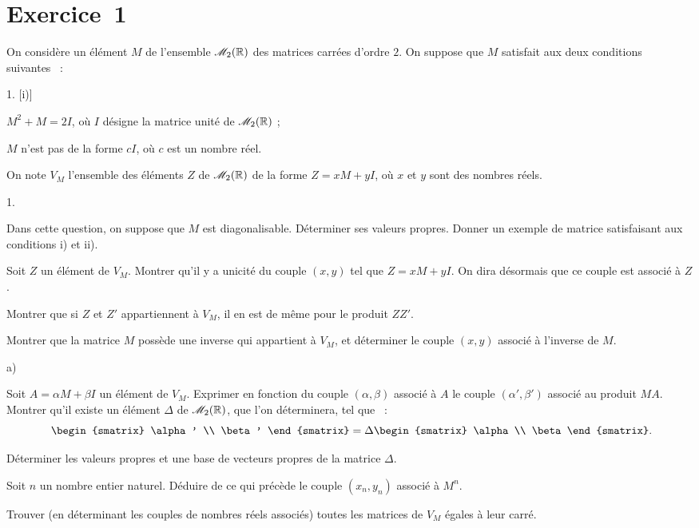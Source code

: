 \documentclass[11pt]{article}%
\begin{document}
\section*{Exercice~1}
On considère un élément $M$ de l'ensemble $\mathscr{M}_{2}(\mathbb{R})$ des matrices carrées
d'ordre $2$. On suppose que $M$ satisfait aux deux conditions
suivantes~ :
\begin{noliste}{1.}
 \setlength{\itemsep}{4mm}[i)]
\item $M^{2} + M = 2I$, où $I$ désigne la matrice unité de $\mathscr{M}_{2}(\mathbb{R})$ ;
\item $M$ n'est pas de la forme $cI$, où $c$ est un nombre réel.
\end{noliste}
On note $V_{M}$ l'ensemble des éléments $Z$ de $\mathscr{M}_{2}(\mathbb{R})$
de la forme $Z = xM + yI$, où $x$ et $y$ sont des nombres réels.
\begin{noliste}{1.}
 \setlength{\itemsep}{4mm}
\item Dans cette question, on suppose que $M$ est diagonalisable.
Déterminer
ses valeurs propres. Donner un exemple de matrice satisfaisant aux 
conditions i) et ii).
\item Soit $Z$ un élément de $V_{M}$. Montrer qu'il y a unicité du
couple
$(x,y)$ tel que $Z = xM + yI$. On dira désormais que ce couple est
associé
à $Z$.
\item Montrer que si $Z$ et $Z'$ appartiennent à $V_{M}$, il en est de
même
pour le produit $ZZ'$.
\item Montrer que la matrice $M$ possède une inverse qui appartient 
à $V_{M}$, et déterminer le couple $(x,y)$ associé à l'inverse de $M$.
\item 
\begin{noliste}{a)}
 \setlength{\itemsep}{2mm}
\item Soit $A = \alpha M + \beta I$ un élément de $V_{M}$.
Exprimer en fonction du couple $(\alpha, \beta )$ associé à $A$ le
couple
$(\alpha', \beta' )$ associé au produit $MA$. Montrer qu'il existe un
élément
$\Delta$ de $\mathscr{M}_{2}(\mathbb{R})$, que l'on déterminera, tel que~ :
\[
 \ \begin{smatrix}
 \alpha' \\
\beta'
\end{smatrix}
 = \Delta
\begin{smatrix}
 \alpha \\
\beta
\end{smatrix}.
\]
\item Déterminer les valeurs propres et une base de vecteurs propres de
la
matrice $\Delta$.
\item Soit $n$ un nombre entier naturel. Déduire de ce qui précède le
couple $(x_{n},y_{n})$ associé à $M^{n}$.
\end{noliste}
\item Trouver (en déterminant les couples de nombres réels associés)
toutes les matrices de $V_{M}$ égales à leur carré.
\end{noliste}
\end{document}
